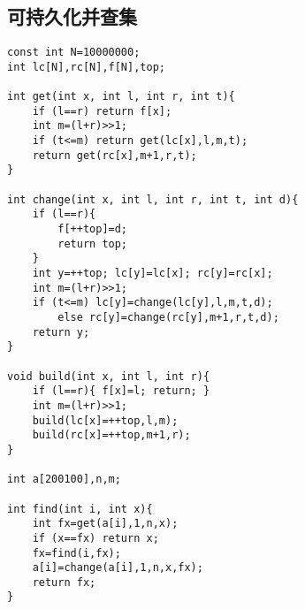 \documentclass{article}
\begin{document}
\subsection{可持久化并查集}
\begin{lstlisting}
const int N=10000000;
int lc[N],rc[N],f[N],top;

int get(int x, int l, int r, int t){
	if (l==r) return f[x];
	int m=(l+r)>>1;
	if (t<=m) return get(lc[x],l,m,t);
	return get(rc[x],m+1,r,t);
}

int change(int x, int l, int r, int t, int d){
	if (l==r){
		f[++top]=d;
		return top;
	}
	int y=++top; lc[y]=lc[x]; rc[y]=rc[x];
	int m=(l+r)>>1;
	if (t<=m) lc[y]=change(lc[y],l,m,t,d);
		else rc[y]=change(rc[y],m+1,r,t,d);
	return y;
}

void build(int x, int l, int r){
	if (l==r){ f[x]=l; return; }
	int m=(l+r)>>1;
	build(lc[x]=++top,l,m);
	build(rc[x]=++top,m+1,r);
}
	
int a[200100],n,m;

int find(int i, int x){
	int fx=get(a[i],1,n,x);
	if (x==fx) return x;
	fx=find(i,fx);
	a[i]=change(a[i],1,n,x,fx);
	return fx;
}
\end{lstlisting}
\end{document}

